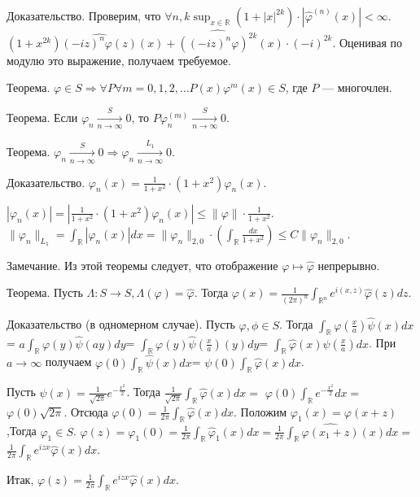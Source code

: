 \documentclass[12pt,titlepage, a4paper]{article}
\begin{document}
Доказательство. Проверим, что $\forall n,k \sup_{x\in\mathbb{R}}
(1+|x|^{2k})\cdot |\hat {\varphi}^{(n)}(x)|<\infty$.
$(1+x^{2k})\widehat {(-iz)^n\varphi(z)}(x)+\widehat
{((-iz)^n\varphi)^{2k}}(x)\cdot (-i)^{2k}$. Оценивая по модулю это
выражение, получаем требуемое.%

Теорема. $\varphi\in S \Rightarrow \forall P \forall
m=0,1,2,\ldots P(x)\varphi^m(x)\in S$, где $P$ --- многочлен.

Теорема. Если $\varphi_n \xrightarrow[n\rightarrow \infty]{S} 0$,
то $P\varphi_{n}^{(m)} \xrightarrow[n\rightarrow \infty]{S} 0$.

Теорема. $\varphi_n \xrightarrow[n\rightarrow \infty]{S} 0
\Rightarrow \varphi_n \xrightarrow[n\rightarrow \infty]{L_1} 0$.

Доказательство. $\varphi_n(x)=\frac{1}{1+x^2}\cdot
(1+x^2)\varphi_n(x)$.

$|\varphi_n(x)|=|\frac{1}{1+x^2}\cdot
(1+x^2)\varphi_n(x)|\leqslant \|\varphi\|\cdot \frac{1}{1+x^2}$.
$\|\varphi_n\|_{L_1}=\int_\mathbb{R}|\varphi_n(x)|dx=\|\varphi_n\|_{2,0}\cdot
(\int_\mathbb{R}\frac{dx}{1+x^2})\leqslant C\|\varphi_n\|_{2,0}$.

Замечание. Из этой теоремы следует, что отображение $\varphi
\mapsto \hat \varphi$ непрерывно.

Теорема. Пусть $\Lambda \colon S \rightarrow S, \Lambda
(\varphi)=\hat \varphi$. Тогда $\varphi
(x)=\frac{1}{(2\pi)^n}\int_{\mathbb{R}^n}e^{i(x,z)}\hat
\varphi(z)dz$.

Доказательство (в одномерном случае). Пусть $\varphi, \phi\in S$.
Тогда $\int_\mathbb{R}\varphi(\frac{x}{a})\hat\psi(x)dx$=
$a\int_\mathbb{R}\varphi(y)\hat\psi(ay)dy$=
$\int_\mathbb{R}\varphi(y)\hat\psi(\frac{x}{a})(y)dy$=
$\int_\mathbb{R}\hat\varphi(x)\psi(\frac{x}{a})dx$. При
$a\rightarrow \infty$ получаем
$\varphi(0)\int_\mathbb{R}\hat\psi(x)dx$=
$\psi(0)\int_\mathbb{R}\hat\varphi(x)dx$.

Пусть $\psi (x)=\frac{1}{\sqrt{2\pi}}e^{-\frac{x^2}{2}}$. Тогда
$\frac{1}{\sqrt{2\pi}}\int_{\mathbb{R}}\hat\varphi (x)dx=$
$\varphi (0)\int_{\mathbb{R}}e^{-\frac{x^2}{2}}dx=$ $\varphi
(0)\sqrt{2\pi}$. Отсюда $\varphi
(0)=\frac{1}{2\pi}\int_{\mathbb{R}}\hat\varphi (x)dx$. Положим
$\varphi_1(x)=\varphi (x+z)$,Тогда $\varphi_1\in S$. $\varphi
(z)=\varphi_1(0)=\frac{1}{2\pi}\int_{\mathbb{R}}\hat\varphi_1
(x)dx=$$\frac{1}{2\pi}\int_{\mathbb{R}}\widehat{\varphi
(x_1+z)}(x)dx=$ $\frac{1}{2\pi}\int_{\mathbb{R}}e^{izx}\hat\varphi
(x)dx$.

Итак, $\varphi(z)=
\frac{1}{2\pi}\int_{\mathbb{R}}e^{izx}\hat\varphi(x)dx$.
\end{document}

